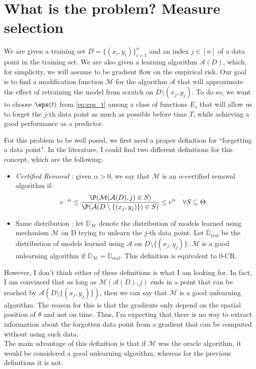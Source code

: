 \section*{What is the problem? Measure selection}
We are given a training set $D=\{(x_i,y_i)\}_{i=1}^n$ and an index $j\in [n]$ of a data point in the training set. We are also given a learning algorithm $\mathcal{A}(D)$, which, for simplicity, we will assume to be gradient flow on the empirical risk.
Our goal is to find a modification function $\mathcal{M}$ for the algorithm $\mathcal{A}$ that will approximate the effect of retraining the model from scratch on $D\setminus{(x_j,y_j)}$.
To do so, we want to choose $\eps(t)$ from \ref{eq:eps_t} among a class of functions $E_s$ that will allow us to forget the $j$-th data point as much as possible before time $T$, while achieving a good performance as a predictor.

For this problem to be well posed, we first need a proper definition for ``forgetting a data point".
In the literature, I could find two different definitions for this concept, which are the following:
\begin{itemize}
  \item \emph{Certified Removal} \cite{guo_certified_2023}: given $\alpha>0$, we say that $\mathcal{M}$ is an $\alpha$-certified removal algorithm if:
  \begin{equation*}
    e^{-\alpha} \leq \frac{\P(\mathcal{M}(\mathcal{A}(D),j)\in S)}{\P(\mathcal{A}(D\setminus\{(x_j,y_j)\})\in S)} \leq e^{\alpha} \quad \forall S\subseteq\Theta.
  \end{equation*}
  \item Same distribution \cite{papernot_unlearning_2020}: let $\mathbb{D}_\mathcal{M}$ denote the distribution of models learned using mechanism $\mathcal{M}$ on D trying to unlearn the $j$-th data point.
   Let $\mathbb{D}_\text{real}$ be the distribution of models learned using $\mathcal{A}$ on $D\setminus\{(x_j,y_j)\}$.
   $\mathcal{M}$ is a good unlearning algorithm if $\mathbb{D}_\mathcal{M}=\mathbb{D}_\text{real}$.
   This definition is equivalent to $0$-CR.
\end{itemize}
However, I don't think either of these definitions is what I am looking for.
In fact, I am convinced that as long as $\mathcal{M}(\mathcal{A}(D),j)$ ends in a point that can be reached by $\mathcal{A}(D\setminus\{(x_j,y_j)\})$, then we can say that $\mathcal{M}$ is a good unlearning algorithm.
The reason for this is that the gradients only depend on the spatial position of $\theta$ and not on time. 
Thus, I'm expecting that there is no way to extract information about the forgotten data point from a gradient that can be computed without using such data. \\
The main advantage of this definition is that if $\mathcal{M}$ was the oracle algorithm, it would be considered a good unlearning algorithm, whereas for the previous definitions it is not.

